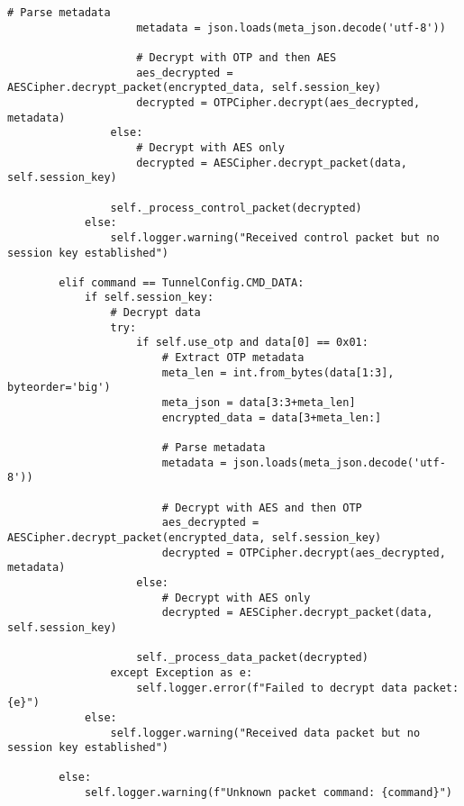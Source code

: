 \documentclass[12pt,a4paper]{report}
\begin{document}
\begin{lstlisting}[style=python, caption=Tunnel Implementation]
                    # Parse metadata
                    metadata = json.loads(meta_json.decode('utf-8'))
                    
                    # Decrypt with OTP and then AES
                    aes_decrypted = AESCipher.decrypt_packet(encrypted_data, self.session_key)
                    decrypted = OTPCipher.decrypt(aes_decrypted, metadata)
                else:
                    # Decrypt with AES only
                    decrypted = AESCipher.decrypt_packet(data, self.session_key)
                
                self._process_control_packet(decrypted)
            else:
                self.logger.warning("Received control packet but no session key established")
                
        elif command == TunnelConfig.CMD_DATA:
            if self.session_key:
                # Decrypt data
                try:
                    if self.use_otp and data[0] == 0x01:
                        # Extract OTP metadata
                        meta_len = int.from_bytes(data[1:3], byteorder='big')
                        meta_json = data[3:3+meta_len]
                        encrypted_data = data[3+meta_len:]
                        
                        # Parse metadata
                        metadata = json.loads(meta_json.decode('utf-8'))
                        
                        # Decrypt with AES and then OTP
                        aes_decrypted = AESCipher.decrypt_packet(encrypted_data, self.session_key)
                        decrypted = OTPCipher.decrypt(aes_decrypted, metadata)
                    else:
                        # Decrypt with AES only
                        decrypted = AESCipher.decrypt_packet(data, self.session_key)
                    
                    self._process_data_packet(decrypted)
                except Exception as e:
                    self.logger.error(f"Failed to decrypt data packet: {e}")
            else:
                self.logger.warning("Received data packet but no session key established")
                
        else:
            self.logger.warning(f"Unknown packet command: {command}")
\end{lstlisting}
\end{document}
